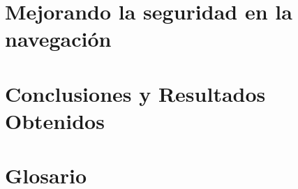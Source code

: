 \documentclass[12pt,twoside]{book}
\begin{document}
\chapter{Mejorando la seguridad en la navegación} 
    \label{capImp}




\chapter{Conclusiones y Resultados Obtenidos}
    \label{capConc}



\appendix
\chapter{Glosario}





%
\end{document}
